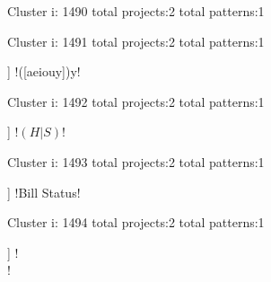 Cluster i: 1490
total projects:2
total patterns:1
\begin{multicols}{1}
\begin{description}[noitemsep,topsep=0pt]
\item [[2] ] \cverb![0-9][} ]*$!
\end{description}
\end{multicols}







Cluster i: 1491
total projects:2
total patterns:1
\begin{multicols}{1}
\begin{description}[noitemsep,topsep=0pt]
\item [[2] ] \cverb!([aeiouy])y!
\end{description}
\end{multicols}







Cluster i: 1492
total projects:2
total patterns:1
\begin{multicols}{1}
\begin{description}[noitemsep,topsep=0pt]
\item [[2] ] \cverb!\((H|S)\)!
\end{description}
\end{multicols}







Cluster i: 1493
total projects:2
total patterns:1
\begin{multicols}{1}
\begin{description}[noitemsep,topsep=0pt]
\item [[2] ] \cverb!Bill Status!
\end{description}
\end{multicols}







Cluster i: 1494
total projects:2
total patterns:1
\begin{multicols}{1}
\begin{description}[noitemsep,topsep=0pt]
\item [[2] ] \cverb!\\[\s.-]!
\end{description}
\end{multicols}







